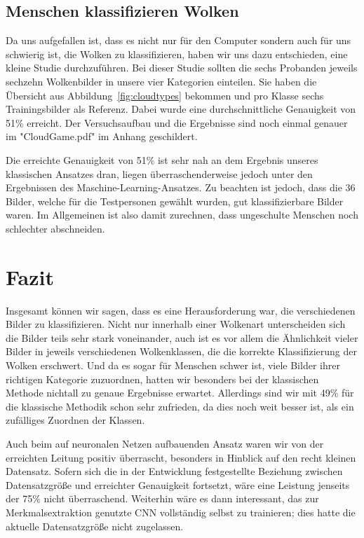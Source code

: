 \documentclass[a4,german]{article}
\begin{document}
\subsection{Menschen klassifizieren Wolken}

Da uns aufgefallen ist, dass es nicht nur für den Computer sondern auch für uns schwierig ist, die Wolken zu klassifizieren, haben wir uns dazu entschieden, eine kleine Studie durchzuführen.
Bei dieser Studie sollten die sechs Probanden jeweils sechzehn Wolkenbilder in unsere vier Kategorien einteilen.
Sie haben die Übersicht aus Abbildung~\ref{fig:cloudtypes} bekommen und pro Klasse sechs Trainingsbilder als Referenz.
Dabei wurde eine durchschnittliche Genauigkeit von 51\% erreicht. Der Versuchsaufbau und die Ergebnisse sind noch einmal genauer im "CloudGame.pdf" im Anhang geschildert.

Die erreichte Genauigkeit von 51\% ist sehr nah an dem Ergebnis unseres klassischen Ansatzes dran, liegen überraschenderweise jedoch unter den Ergebnissen des Maschine-Learning-Ansatzes.
Zu beachten ist jedoch, dass die 36 Bilder, welche für die Testpersonen gewählt wurden, gut klassifizierbare Bilder waren.
Im Allgemeinen ist also damit zurechnen, dass ungeschulte Menschen noch schlechter abschneiden.

\section{Fazit}
\label{sec:fazit}


Insgesamt können wir sagen, dass es eine Herausforderung war, die verschiedenen Bilder zu klassifizieren.
Nicht nur innerhalb einer Wolkenart unterscheiden sich die Bilder teils sehr stark voneinander, auch ist es vor allem die Ähnlichkeit vieler Bilder in jeweils verschiedenen Wolkenklassen, die die korrekte Klassifizierung der Wolken erschwert.
Und da es sogar für Menschen schwer ist, viele Bilder ihrer richtigen Kategorie zuzuordnen, hatten wir besonders bei der klassischen Methode nichtall zu genaue Ergebnisse erwartet.
Allerdings sind wir mit 49\% für die klassische Methodik schon sehr zufrieden, da dies noch weit besser ist, als ein zufälliges Zuordnen der Klassen.

Auch beim auf neuronalen Netzen aufbauenden Ansatz waren wir von der erreichten Leitung positiv überrascht, besonders in Hinblick auf den recht kleinen Datensatz.
Sofern sich die in der Entwicklung festgestellte Beziehung zwischen Datensatzgröße und erreichter Genauigkeit fortsetzt, wäre eine Leistung jenseits der 75\% nicht überraschend.
Weiterhin wäre es dann interessant, das zur Merkmalsextraktion genutzte CNN vollständig selbst zu trainieren; dies hatte die aktuelle Datensatzgröße nicht zugelassen.
\end{document}
